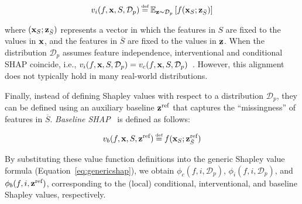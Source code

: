 \begin{equation}
    v_i(f,\x,S, \mathcal{D}_p) \myeq \mathbb{E}_{\z \sim \mathcal{D}_p} \left[ f(\x_{S}; \z_{\Bar{S}}) \right]
\end{equation}

where $(\textbf{x}_{S}; \textbf{z}_{\Bar{S}})$ represents a vector in which the features in $S$ are fixed to the values in $\textbf{x}$, and the features in $\overline{S}$ are fixed to the values in $\textbf{z}$. When the distribution $\mathcal{D}_p$ assumes feature independence, interventional and conditional SHAP coincide, i.e., $v_i(f,\textbf{x},S, \mathcal{D}_p)=v_c(f,\textbf{x},S, \mathcal{D}_p)$~\citep{sundararajan20b}. However, this alignment does not typically hold in many real-world distributions.

Finally, instead of defining Shapley values with respect to a distribution $\mathcal{D}_p$, they can be defined using an auxiliary baseline $\textbf{z}^{\text{ref}}$ that captures the ``missingness'' of features in $\overline{S}$. \emph{Baseline SHAP}~\citep{sundararajan20b} is defined as follows:


\begin{equation}
    v_b(f,\x,S, \z^{\text{ref}}) \myeq f(\x_{S}; \z^{\text{ref}}_{\Bar{S}}) 
\end{equation}




By substituting these value function definitions into the generic Shapley value formula (Equation~\ref{eq:genericshap}), we obtain $\phi_c(f,i,\mathcal{D}_p)$, $\phi_i(f,i, \mathcal{D}_p)$, and $\phi_b(f,i, \textbf{z}^{\text{ref}})$, corresponding to the (local) conditional, interventional, and baseline Shapley values, respectively.

